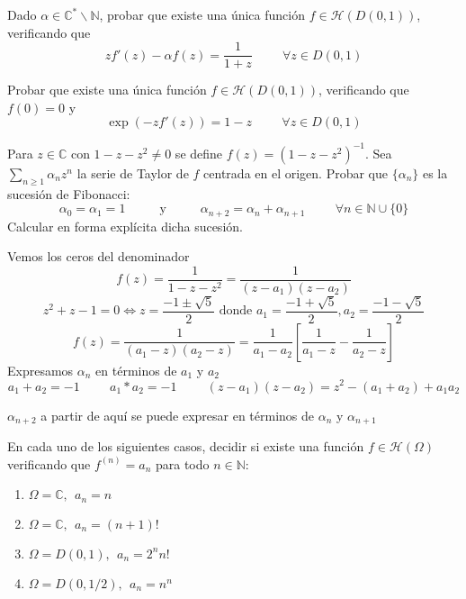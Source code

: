 \begin{ejer}
	Dado $\alpha\in\mathbb{C}^{\ast}\backslash\mathbb{N}$, probar que existe una única función $f\in\mathcal{H}(D(0,1))$, verificando que
	$$ zf'(z)-\alpha f(z) = \frac{1}{1+z} \hspace{1cm} \forall z\in D(0,1) $$
\end{ejer}

\begin{ejer}
	Probar que existe una única función $f\in\mathcal{H}(D(0,1))$, verificando que $f(0)=0$ y 
	$$ \exp(-zf'(z)) = 1-z \hspace{1cm} \forall z\in D(0,1) $$
\end{ejer}



\begin{ejer}
	Para $z\in\mathbb{C}$ con $1-z-z^2\not =0$ se define $f(z) = (1-z-z^2)^{-1}$. Sea $\sum_{n\geq 1}\alpha_nz^n$ la serie de Taylor de $f$ centrada en el origen. Probar que $\{\alpha_n \}$ es la sucesión de Fibonacci:
	$$ \alpha_0 = \alpha_{1} = 1 \hspace{1cm}\text{ y }\hspace{1cm} \alpha_{n+2} = \alpha_n + \alpha_{n+1} \hspace{1cm}\forall n\in\mathbb{N}\cup\{0\}  $$
	Calcular en forma explícita dicha sucesión.
\end{ejer}
\begin{sol}
Vemos los ceros del denominador
$$f(z) = \frac{1}{1-z-z^2} = \frac{1}{(z-a_1)(z-a_2)} $$
$$z^2+z-1 = 0 \Longleftrightarrow z = \frac{-1\pm \sqrt{5}}{2} \text{\  donde\ } a_1=\frac{-1+ \sqrt{5}}{2},a_2=\frac{-1- \sqrt{5}}{2}$$
$$f(z) = \frac{1}{(a_1-z)(a_2-z)} = \frac{1}{a_1-a_2}\left[ \frac{1}{a_1-z}-\frac{1}{a_2-z} \right]$$
Expresamos $\alpha_n$ en términos de $a_1$ y $a_2$
$$a_1+a_2 = -1 \hspace{1cm}a_1*a_2=-1 \hspace{1cm}(z-a_1)(z-a_2) = z^2-(a_1+a_2) + a_1a_2$$

$\alpha_{n+2}$ a partir de aquí se puede expresar en términos de $\alpha_n$ y $\alpha_{n+1}$
\end{sol}


\begin{ejer}
	En cada uno de los siguientes casos, decidir si existe una función $f\in\mathcal{H}(\Omega)$ verificando que $f^{(n)}=a_n$ para todo $n\in\mathbb{N}$:
	\begin{enumerate}[label=(\alph*)]
		\item $\Omega = \mathbb{C}, \ \ a_n=n$
		\item $\Omega=\mathbb{C},\ \ a_n=(n+1)!$
		\item $\Omega=D(0,1), \ \ a_n=2^nn!$
		\item $\Omega=D(0,1/2), \ \ a_n=n^n$
	\end{enumerate}
\end{ejer}

